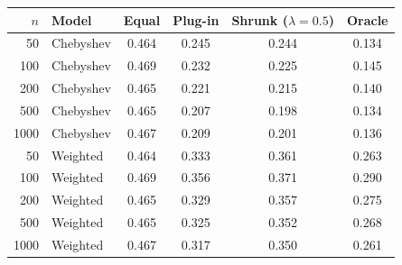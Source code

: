 \begin{tabular}{rlcccc}\toprule
$n$ & Model & Equal & Plug-in & Shrunk ($\lambda{=}0.5$) & Oracle\\\midrule
50 & Chebyshev & 0.464 & 0.245 & 0.244 & 0.134\\
100 & Chebyshev & 0.469 & 0.232 & 0.225 & 0.145\\
200 & Chebyshev & 0.465 & 0.221 & 0.215 & 0.140\\
500 & Chebyshev & 0.465 & 0.207 & 0.198 & 0.134\\
1000 & Chebyshev & 0.467 & 0.209 & 0.201 & 0.136\\
50 & Weighted & 0.464 & 0.333 & 0.361 & 0.263\\
100 & Weighted & 0.469 & 0.356 & 0.371 & 0.290\\
200 & Weighted & 0.465 & 0.329 & 0.357 & 0.275\\
500 & Weighted & 0.465 & 0.325 & 0.352 & 0.268\\
1000 & Weighted & 0.467 & 0.317 & 0.350 & 0.261\\
\bottomrule\end{tabular}
